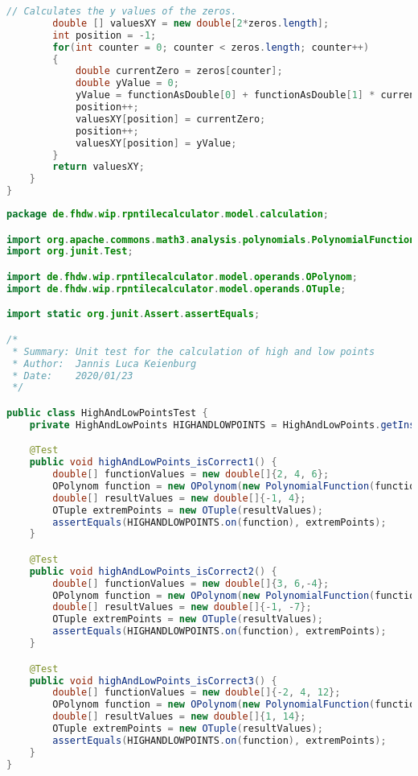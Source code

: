 \begin{lstlisting}[caption=HighAndLowPoints (Keienburg),label=list:HighAndLowPoints,language=Java]
        // Calculates the y values of the zeros.
        double [] valuesXY = new double[2*zeros.length];
        int position = -1;
        for(int counter = 0; counter < zeros.length; counter++)
        {
            double currentZero = zeros[counter];
            double yValue = 0;
            yValue = functionAsDouble[0] + functionAsDouble[1] * currentZero + Math.pow(currentZero, 2) * functionAsDouble[2];
            position++;
            valuesXY[position] = currentZero;
            position++;
            valuesXY[position] = yValue;
        }
        return valuesXY;
    }
}
\end{lstlisting}    

\begin{lstlisting}[caption=HighAndLowPointsTest (Keienburg),label=list:HighAndLowPointsTest,language=Java]
package de.fhdw.wip.rpntilecalculator.model.calculation;

import org.apache.commons.math3.analysis.polynomials.PolynomialFunction;
import org.junit.Test;

import de.fhdw.wip.rpntilecalculator.model.operands.OPolynom;
import de.fhdw.wip.rpntilecalculator.model.operands.OTuple;

import static org.junit.Assert.assertEquals;

/*
 * Summary: Unit test for the calculation of high and low points
 * Author:  Jannis Luca Keienburg
 * Date:    2020/01/23
 */

public class HighAndLowPointsTest {
    private HighAndLowPoints HIGHANDLOWPOINTS = HighAndLowPoints.getInstance();

    @Test
    public void highAndLowPoints_isCorrect1() {
        double[] functionValues = new double[]{2, 4, 6};
        OPolynom function = new OPolynom(new PolynomialFunction(functionValues));
        double[] resultValues = new double[]{-1, 4};
        OTuple extremPoints = new OTuple(resultValues);
        assertEquals(HIGHANDLOWPOINTS.on(function), extremPoints);
    }

    @Test
    public void highAndLowPoints_isCorrect2() {
        double[] functionValues = new double[]{3, 6,-4};
        OPolynom function = new OPolynom(new PolynomialFunction(functionValues));
        double[] resultValues = new double[]{-1, -7};
        OTuple extremPoints = new OTuple(resultValues);
        assertEquals(HIGHANDLOWPOINTS.on(function), extremPoints);
    }

    @Test
    public void highAndLowPoints_isCorrect3() {
        double[] functionValues = new double[]{-2, 4, 12};
        OPolynom function = new OPolynom(new PolynomialFunction(functionValues));
        double[] resultValues = new double[]{1, 14};
        OTuple extremPoints = new OTuple(resultValues);
        assertEquals(HIGHANDLOWPOINTS.on(function), extremPoints);
    }
}
\end{lstlisting} 

